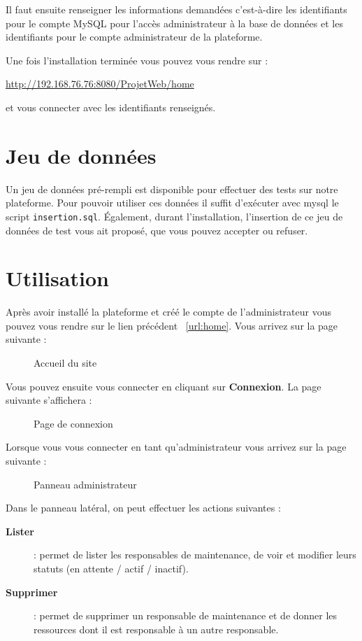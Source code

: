 Il faut ensuite renseigner les informations demandées c'est-à-dire les identifiants pour le
compte MySQL pour l'accès administrateur à la base de données et les identifiants pour le compte
administrateur de la plateforme.

Une fois l'installation terminée vous pouvez vous rendre sur :
\begin{center}
    \label{url:home}
    \url{http://192.168.76.76:8080/ProjetWeb/home}
\end{center}
et vous connecter avec les identifiants renseignés.

\section{Jeu de données}

Un jeu de données pré-rempli est disponible pour effectuer des tests sur notre plateforme.
Pour pouvoir utiliser ces données il suffit d'exécuter avec mysql le script \verb:insertion.sql:.
Également, durant l'installation, l'insertion de ce jeu de données de test vous ait proposé, que
vous pouvez accepter ou refuser.
\newpage

\section{Utilisation}

Après avoir installé la plateforme et créé le compte de l'administrateur vous pouvez vous rendre
sur le lien précédent ~\ref{url:home}. Vous arrivez sur la page suivante :

\begin{figure}[h]
    \centering
    \caption{Accueil du site}
\end{figure}

Vous pouvez ensuite vous connecter en cliquant sur \textbf{Connexion}. La page suivante
s'affichera :
\begin{figure}[h]
    \centering
    \caption{Page de connexion}
\end{figure}

Lorsque vous vous connecter en tant qu'administrateur vous arrivez sur la page suivante :
\begin{figure}[h]
    \centering
    \caption{Panneau administrateur}
\end{figure}

Dans le panneau latéral, on peut effectuer les actions suivantes :
\begin{description}
    \item[\textbf{Lister}] : permet de lister les responsables de maintenance, de voir et modifier
        leurs statuts (en attente / actif / inactif).
    \item[\textbf{Supprimer}] : permet de supprimer un responsable de maintenance et de donner les
        ressources dont il est responsable à un autre responsable.
\end{description}
\medskip

